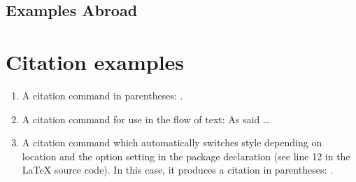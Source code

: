 \subsection{ Examples Abroad }

\section*{Citation examples}
\begin{enumerate}
\item A citation command in parentheses: \parencite{Smith:2012qr}.
\item A citation command for use in the flow of text: As \textcite{Smith:2013jd} said \dots
\item A citation command which automatically switches style depending on location and the option setting in the package declaration (see line 12 in the LaTeX source code). In this case, it produces a citation in parentheses: \autocite{Other:2014ab}.
\end{enumerate}